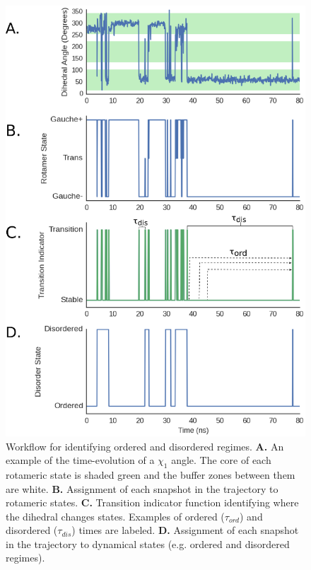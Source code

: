 \documentclass[../main.tex]{subfiles}
\begin{document}
    \begin{figure}[!htb] %
        \centering
        \includegraphics[width=5in]{cards-workflow-fig.eps}
        \caption[Workflow for identifying ordered and disordered regimes.]
            {Workflow for identifying ordered and disordered regimes. \textbf{A.} An example of the time-evolution of a $\chi_1$ angle. The core of each rotameric state is shaded green and the buffer zones between them are white. \textbf{B.} Assignment of each snapshot in the trajectory to rotameric states. \textbf{C.} Transition indicator function identifying where the dihedral changes states. Examples of ordered ($\tau_{ord}$) and disordered ($\tau_{dis}$) times are labeled. \textbf{D.} Assignment of each snapshot in the trajectory to dynamical states (e.g. ordered and disordered regimes).}
        \label{fig:cards-workflow-fig}
    \end{figure}
    
\end{document}
